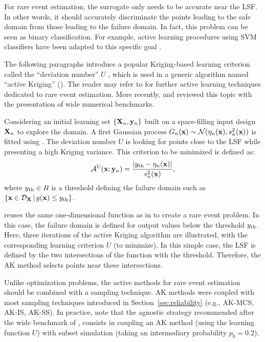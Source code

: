 For rare event estimation, the surrogate only needs to be accurate near the LSF. 
In other words, it should accurately discriminate the points leading to the safe domain from those leading to the failure domain. 
In fact, this problem can be seen as binary classification. 
For example, active learning procedures using SVM classifiers have been adapted to this specific goal \citep{bourinet_2018}. 

The following paragraphs introduce a popular Kriging-based learning criterion called the ``deviation number'' $U$ \citep{echard_2011}, which is used in a generic algorithm named ``active Kriging'' (). 
The reader may refer to \citet{MorioBalesdent2015} for further active learning techniques dedicated to rare event estimation. 
More recently, \citet{teixeira_2021} and \citet{moustapha_ss_2022} reviewed this topic with the presentation of wide numerical benchmarks.

Considering an initial learning set $\left\{{\bf X}_n, {\bf y}_n\right\}$ built on a space-filling input design ${\bf X}_n$ to explore the domain. 
A first Gaussian process $G_n({\bf x}) \sim \mathcal{N}(\eta_n({\bf x}), s_n^2({\bf x}))$ is fitted using . 
The deviation number $U$ is looking for points close to the LSF while presenting a high Kriging variance. 
This criterion to be minimized is defined as:   
\begin{equation}
    \mathcal{A}^{\textrm{U}}({\bf x}; {\bf y}_n) = \frac{\left|y_\mathrm{th} - \eta_n({\bf x})\right|}{s_n^2({\bf x})}, 
    \label{eq:U}
\end{equation}
where $y_\mathrm{th} \in R$ is a threshold defining the failure domain such as $\{{\bf x} \in \mathcal{D}_{\bf X} \, | \, g({\bf x}) \leq y_\mathrm{th}\}$. 

 reuses the same one-dimensional function as in  to create a rare event problem. 
In this case, the failure domain is defined for output values below the threshold $y_\mathrm{th}$. 
Here, three iterations of the active Kriging algorithm are illustrated, with the corresponding learning criterion $U$ (to minimize). 
In this simple case, the LSF is defined by the two intersections of the function with the threshold. 
Therefore, the AK method selects points near these intersections. 


Unlike optimization problems, the active methods for rare event estimation should be combined with a sampling technique. 
AK methods were coupled with most sampling techniques introduced in Section~\ref{sec:reliability} (e.g., AK-MCS, AK-IS, AK-SS). 
In practice, note that the agnostic strategy recommended after the wide benchmark of \citet{moustapha_ss_2022}, consists in coupling an AK method (using the learning function $U$) with subset simulation (taking an intermediary probability $p_0 =0.2$). 

